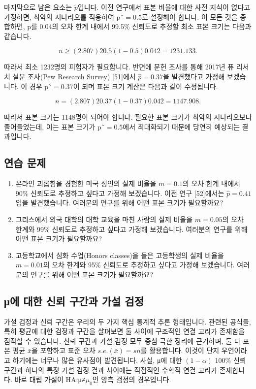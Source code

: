 \documentclass[
]{scrbook}
\providecommand{\tightlist}{%
  \setlength{\itemsep}{0pt}\setlength{\parskip}{0pt}}
\begin{document}
마지막으로 남은 요소는 \(\tilde{p}\)입니다. 이전 연구에서 표본 비율에
대한 사전 지식이 없다고 가정하면, 최악의 시나리오를 적용하여
p˜\(=0.5\)로 설정해야 합니다. 이 모든 것을 종합하면, p를 0.04의 오차
한계 내에서 99.5\% 신뢰도로 추정할 최소 표본 크기는 다음과 같습니다.

\[
n\ge (2.807)20.5(1-0.5)0.042=1231.133.
\]

따라서 최소 1232명의 피험자가 필요합니다. 반면에 문헌 조사를 통해 2017년
퓨 리서치 설문 조사(Pew Research Survey) {[}51{]}에서 \(\hat{p}=0.37\)을
발견했다고 가정해 보겠습니다. 이 경우 p˜\(=0.37\)이 되며 표본 크기
계산은 다음과 같이 수정됩니다.

\[
n=(2.807)20.37(1-0.37)0.042=1147.908.
\]

따라서 표본 크기는 1148명이 되어야 합니다. 필요한 표본 크기가 최악의
시나리오보다 줄어들었는데, 이는 표본 크기가 p˜\(=0.5\)에서 최대화되기
때문에 당연히 예상되는 결과입니다.

\subsection{연습 문제}\label{uxc5f0uxc2b5-uxbb38uxc81c-2}

\begin{enumerate}
\def\labelenumi{\arabic{enumi}.}
\setcounter{enumi}{6}
\tightlist
\item
  온라인 괴롭힘을 경험한 미국 성인의 실제 비율을 \(m=0.1\)의 오차 한계
  내에서 90\% 신뢰도로 추정하고 싶다고 가정해 보겠습니다. 이전 연구
  {[}52{]}에서는 \(\hat{p}=0.41\)임을 발견했습니다. 여러분의 연구를 위해
  어떤 표본 크기가 필요할까요?
\item
  그리스에서 외국 대학의 대학 교육을 마친 사람의 실제 비율을
  \(m=0.05\)의 오차 한계와 99\% 신뢰도로 추정하고 싶다고 가정해
  보겠습니다. 여러분의 연구를 위해 어떤 표본 크기가 필요할까요?
\item
  고등학교에서 심화 수업(Honors classes)을 들은 고등학생의 실제 비율을
  \(m=0.01\)의 오차 한계와 95\% 신뢰도로 추정하고 싶다고 가정해
  보겠습니다. 여러분의 연구를 위해 어떤 표본 크기가 필요할까요?
\end{enumerate}

\subsection{μ에 대한 신뢰 구간과 가설
검정}\label{ux3bcuxc5d0-uxb300uxd55c-uxc2e0uxb8b0-uxad6cuxac04uxacfc-uxac00uxc124-uxac80uxc815}

가설 검정과 신뢰 구간은 우리의 두 가지 핵심 통계적 추론 형태입니다.
관련된 공식들, 특히 평균에 대한 검정과 구간을 살펴보면 둘 사이에
구조적인 연결 고리가 존재함을 짐작할 수 있습니다. 신뢰 구간과 가설 검정
모두 중심 극한 정리에 근거하며, 둘 다 표본 평균 \(\bar{x}\)을 포함하고
표준 오차 \(s.e.(\bar{x})=sn\)를 활용합니다. 이것이 단지 우연이라고
하기에는 너무나 많은 유사점이 발견됩니다. 사실, μ에 대한 \((1-\alpha)\)
100\% 신뢰 구간과 하나의 특정 가설 검정 결과 사이에는 직접적인 수학적
연결 고리가 존재합니다. 바로 대립 가설이 HA:μ≠\(\mu_0\)인 양측 검정의
경우입니다.
\end{document}
